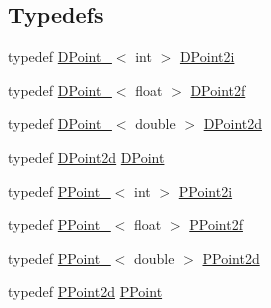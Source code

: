 \subsection*{Typedefs}
\begin{DoxyCompactItemize}
\item 
typedef \hyperlink{classnubot_1_1DPoint__}{D\-Point\-\_\-}$<$ int $>$ \hyperlink{namespacenubot_ae69184d9b1bffbfbf9d691878fdab937}{D\-Point2i}
\item 
typedef \hyperlink{classnubot_1_1DPoint__}{D\-Point\-\_\-}$<$ float $>$ \hyperlink{namespacenubot_a6be33a8f735ad395ebcd6406ac569f6c}{D\-Point2f}
\item 
typedef \hyperlink{classnubot_1_1DPoint__}{D\-Point\-\_\-}$<$ double $>$ \hyperlink{namespacenubot_ab9fab4518d012a39668ef9243a79592d}{D\-Point2d}
\item 
typedef \hyperlink{namespacenubot_ab9fab4518d012a39668ef9243a79592d}{D\-Point2d} \hyperlink{namespacenubot_aa018cd283eed6867313e025b8274d7cb}{D\-Point}
\item 
typedef \hyperlink{classnubot_1_1PPoint__}{P\-Point\-\_\-}$<$ int $>$ \hyperlink{namespacenubot_a2de267f77449de1b98bfeb641671301b}{P\-Point2i}
\item 
typedef \hyperlink{classnubot_1_1PPoint__}{P\-Point\-\_\-}$<$ float $>$ \hyperlink{namespacenubot_a93e65a2d123526a505e4364043785072}{P\-Point2f}
\item 
typedef \hyperlink{classnubot_1_1PPoint__}{P\-Point\-\_\-}$<$ double $>$ \hyperlink{namespacenubot_a2b8f952f9a6ec80df0a885dbca6671f9}{P\-Point2d}
\item 
typedef \hyperlink{namespacenubot_a2b8f952f9a6ec80df0a885dbca6671f9}{P\-Point2d} \hyperlink{namespacenubot_a8f62d6210d4a62013af1a40cd5f39de2}{P\-Point}
\end{DoxyCompactItemize}
